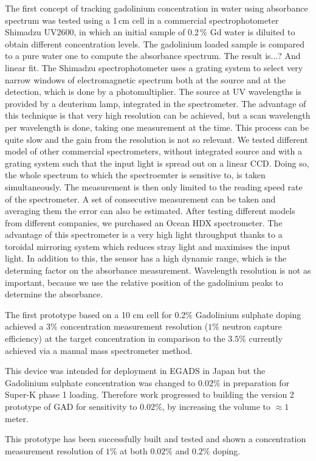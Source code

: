 The first concept of tracking gadolinium concentration in water using absorbance spectrum %
was tested using a 1\,cm cell in a commercial spectrophotometer Shimadzu UV2600, %
in which an initial sample of 0.2\,\% Gd water is diluited to obtain different concentration levels.
The gadolinium loaded sample is compared to a pure water one to compute the absorbance spectrum.
The result is...? And linear fit.
The Shimadzu spectrophotometer uses a grating system to select very narrow windows of electromagnetic spectrum %
both at the source and at the detection, which is done by a photomultiplier.
The source at UV wavelengths is provided by a deuterium lamp, integrated in the spectrometer.
The advantage of this technique is that very high resolution can be achieved, %
but a scan wavelength per wavelength is done, taking one measurement at the time.
This process can be quite slow and the gain from the resolution is not so relevant.
We tested different model of other commercial spectrometers, without integrated source and %
with a grating system such that the input light is spread out on a linear CCD.
Doing so, the whole spectrum to which the spectroemter is sensitive to, is taken simultaneously.
The measurement is then only limited to the reading speed rate of the spectrometer.
A set of consecutive measurement can be taken and averaging them the error can also be estimated.
After testing different models from different companies, we purchased an Ocean HDX spectrometer.
The advantage of this spectrometer is a very high light throughput thanks to a toroidal mirroring system %
which reduces stray light and maximises the input light.
In addition to this, the sensor has a high dynamic range, which is the determing factor %
on the absorbance measurement.
Wavelength resolution is not as important, because we use the relative position of the gadolinium peaks %
to determine the absorbance.

The first prototype based on a 10 cm cell for 0.2$\%$ Gadolinium sulphate doping achieved %
a $3\%$ concentration measurement resolution ($1\%$ neutron capture efficiency) %
at the target concentration in comparison to the $3.5\%$ currently achieved via a manual mass spectrometer method.

This device was intended for deployment in EGADS in Japan but the Gadolinium sulphate %
concentration was changed to $0.02\%$ in preparation for Super-K phase 1 loading.
Therefore work progressed to building the version 2 prototype of GAD for %
sensitivity to $0.02\%$, by increasing the volume to $\approx 1$ meter.

This prototype has been successfully built and tested and shown a concentration measurement %
resolution of $1\%$ at both $0.02\%$ and $0.2\%$ doping.


